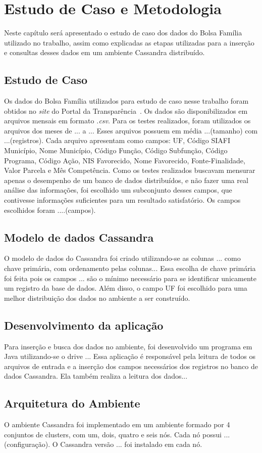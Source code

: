 \chapter{Estudo de Caso e Metodologia}

Neste capítulo será apresentado o estudo de caso dos dados do Bolsa Família utilizado no trabalho, assim como explicadas as etapas utilizadas para a inserção e consultas desses dados em um ambiente Cassandra distribuído.

\section{Estudo de Caso}
Os dados do Bolsa Família utilizados para estudo de caso nesse trabalho foram obtidos no \emph{site} do Portal da Transparência~\cite{portaltransparencia}. Os dados são disponibilizados em arquivos mensais em formato \emph{.csv}. Para os testes realizados, foram utilizados os arquivos dos meses de ... a ... Esses arquivos possuem em média ...(tamanho) com ...(registros). Cada arquivo apresentam como campos: UF, Código SIAFI Município, Nome Município, Código Função, Código Subfunção, Código Programa, Código Ação, NIS Favorecido, Nome Favorecido, Fonte-Finalidade, Valor Parcela e Mês Competência. Como os testes realizados buscavam mensurar apenas o desempenho de um banco de dados distribuídos, e não fazer uma real análise das informações, foi escolhido um subconjunto desses campos, que contivesse informações suficientes para um resultado satisfatório. Os campos escolhidos foram ....(campos).

\section{Modelo de dados Cassandra}
O modelo de dados do Cassandra foi criado utilizando-se as colunas ... como chave primária, com ordenamento pelas colunas... Essa escolha de chave primária foi feita pois os campos ... são o mínimo necessário para se identificar unicamente um registro da base de dados. Além disso, o campo UF foi escolhido para uma melhor distribuição dos dados no ambiente a ser construído.

\section{Desenvolvimento da aplicação}
Para inserção e busca dos dados no ambiente, foi desenvolvido um programa em Java utilizando-se o drive ... Essa aplicação é responsável pela leitura de todos os arquivos de entrada e a inserção dos campos necessários dos registros no banco de dados Cassandra. Ela também realiza a leitura dos dados...

\section{Arquitetura do Ambiente}
O ambiente Cassandra foi implementado em um ambiente formado por 4 conjuntos de clusters, com um, dois, quatro e seis nós. Cada nó possui ...(configuração).
O Cassandra versão ... foi instalado em cada nó. 






